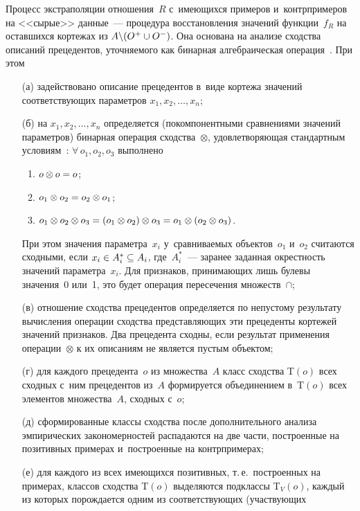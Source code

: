 \begin{multicols}{2}
  Процесс экстраполяции отношения~$R$ с~име\-ющих\-ся примеров 
и~контрпримеров на <<сырые>> данные~--- процедура восстановления 
значений функции~$f_R$ на оставшихся кортежах из $A\backslash (O^+\hm\cup 
O^-)$. Она основана на анализе сходства описаний прецедентов, уточняемого 
как бинарная алгебраическая операция~\cite{11-gr}. При этом 
  \begin{itemize}
\item[(а)]
задействовано описание прецедентов в~виде кортежа значений 
соответствующих па\-ра\-мет\-ров $x_1, x_2,\ldots , x_n$; 
\item[(б)]
на $x_1, x_2,\ldots , x_n$ определяется (покомпонентными сравнениями 
значений параметров) бинарная операция сходства~$\otimes$, 
удовле\-тво\-ря\-ющая стандартным условиям~\cite{11-gr}: $\forall\,o_1,o_2,o_3$ 
выполнено
\begin{enumerate}[(1)]
\item $o\otimes o\hm= o$; 
\item $o_1\otimes o_2\hm= o_2\otimes o_1$; 
\item $o_1\otimes o_2\otimes o_3\hm= (o_1\otimes o_2)\otimes o_3\hm= o_1\otimes 
(o_2\otimes o_3)$.
\end{enumerate}
 При этом значения параметра~$x_i$ у~срав\-ни\-ва\-емых 
объектов~$o_1$ и~$o_2$ считаются сходными, если $x_i\hm\in A_i^* \hm 
\subseteq A_i$, где~$A_i^*$~--- заранее заданная окрестность значений 
параметра~$x_i$. Для признаков, принимающих лишь булевы значения~0 
или~1, это будет операция  пересечения множеств~$\cap$;
\item[(в)]
отношение сходства прецедентов определяется по непустому результату 
вычисления операции сходства представляющих эти прецеденты кортежей 
значений признаков. Два прецедента сходны, если результат применения 
операции~$\otimes$ к их описаниям не является пустым объектом;
\item[(г)]
для каждого прецедента~$o$ из множества~$A$ класс сходства T$(o)$ всех 
сходных с~ним прецедентов из~$A$ формируется объединением в~T$(o)$ 
всех элементов множества~$A$, сходных с~$o$;
\item[(д)]
сформированные классы сходства после дополнительного анализа 
эмпирических закономерностей распадаются на две части, построенные на 
позитивных примерах и~построенные на контрпримерах; 
\item[(е)]
для каждого из всех имеющихся позитивных, т.\,е.\ построенных на 
примерах, классов сходства T$(o)$ выделяются подклассы T$_V(o)$, каждый 
из которых порождается одним из со\-от\-вет\-ст\-ву\-ющих (участвующих 

\end{itemize}
\end{multicols}
